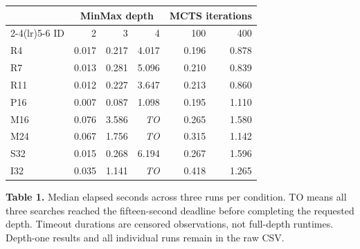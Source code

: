 \begin{center}\small
\setlength{\tabcolsep}{7pt}
\begin{tabular}{lrrrrr}
\toprule
 & \multicolumn{3}{c}{MinMax depth} & \multicolumn{2}{c}{MCTS iterations} \\
\cmidrule(lr){2-4}\cmidrule(lr){5-6}
ID & 2 & 3 & 4 & 100 & 400 \\
\midrule
R4 & 0.017 & 0.217 & 4.017 & 0.196 & 0.878 \\
R7 & 0.013 & 0.281 & 5.096 & 0.210 & 0.839 \\
R11 & 0.012 & 0.227 & 3.647 & 0.213 & 0.860 \\
P16 & 0.007 & 0.087 & 1.098 & 0.195 & 1.110 \\
M16 & 0.076 & 3.586 & \textit{TO} & 0.265 & 1.580 \\
M24 & 0.067 & 1.756 & \textit{TO} & 0.315 & 1.142 \\
S32 & 0.015 & 0.268 & 6.194 & 0.267 & 1.596 \\
I32 & 0.035 & 1.141 & \textit{TO} & 0.418 & 1.265 \\
\bottomrule
\end{tabular}
\end{center}
{\small\textbf{Table 1.} Median elapsed seconds across three runs per condition. TO means all three searches reached the fifteen-second deadline before completing the requested depth. Timeout durations are censored observations, not full-depth runtimes. Depth-one results and all individual runs remain in the raw CSV.}
